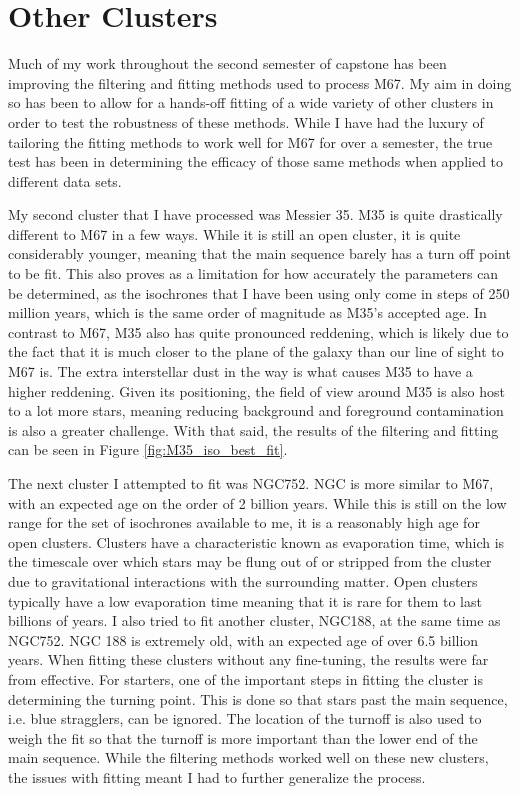 \documentclass[aps,prb,twocolumn,groupedaddress,nofootinbib,floatfix]{revtex4-1}
\begin{document}
\section*{Other Clusters}

Much of my work throughout the second semester of capstone has been improving the filtering and fitting methods used to process M67. My aim in doing so has been to allow for a hands-off fitting of a wide variety of other clusters in order to test the robustness of these methods. While I have had the luxury of tailoring the fitting methods to work well for M67 for over a semester, the true test has been in determining the efficacy of those same methods when applied to different data sets. 

My second cluster that I have processed was Messier 35. M35 is quite drastically different to M67 in a few ways. While it is still an open cluster, it is quite considerably younger, meaning that the main sequence barely has a turn off point to be fit. This also proves as a limitation for how accurately the parameters can be determined, as the isochrones that I have been using only come in steps of 250 million years, which is the same order of magnitude as M35's accepted age. In contrast to M67, M35 also has quite pronounced reddening, which is likely due to the fact that it is much closer to the plane of the galaxy than our line of sight to M67 is. The extra interstellar dust in the way is what causes M35 to have a higher reddening. Given its positioning, the field of view around M35 is also host to a lot more stars, meaning reducing background and foreground contamination is also a greater challenge. With that said, the results of the filtering and fitting can be seen in Figure \ref{fig:M35_iso_best_fit}.

The next cluster I attempted to fit was NGC752. NGC is more similar to M67, with an expected age on the order of 2 billion years. While this is still on the low range for the set of isochrones available to me, it is a reasonably high age for open clusters. Clusters have a characteristic known as evaporation time, which is the timescale over which stars may be flung out of or stripped from the cluster due to gravitational interactions with the surrounding matter. Open clusters typically have a low evaporation time meaning that it is rare for them to last billions of years. I also tried to fit another cluster, NGC188, at the same time as NGC752. NGC 188 is extremely old, with an expected age of over 6.5 billion years. When fitting these clusters without any fine-tuning, the results were far from effective. For starters, one of the important steps in fitting the cluster is determining the turning point. This is done so that stars past the main sequence, i.e. blue stragglers, can be ignored. The location of the turnoff is also used to weigh the fit so that the turnoff is more important than the lower end of the main sequence. While the filtering methods worked well on these new clusters, the issues with fitting meant I had to further generalize the process.
\end{document}
